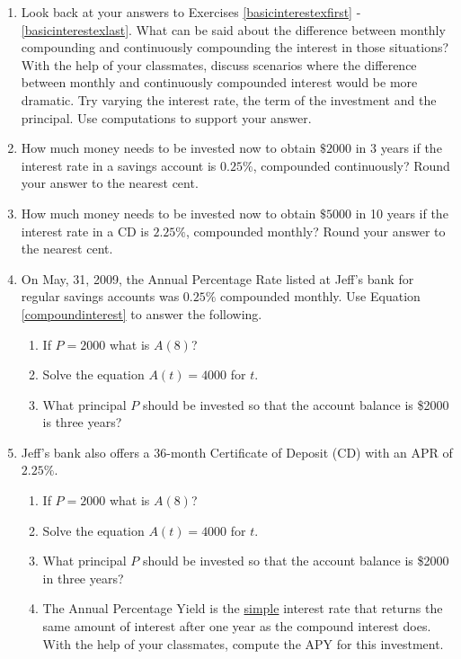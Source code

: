 \begin{enumerate}
\setcounter{enumi}{\value{HW}}

\item  Look back at your answers to Exercises \ref{basicinterestexfirst} - \ref{basicinterestexlast}. What can be said about the difference between monthly compounding and continuously compounding the interest in those situations?  With the help of your classmates, discuss scenarios where the difference between monthly  and continuously compounded interest would be more dramatic.  Try varying the interest rate, the term of the investment and the principal.  Use computations to support your answer.

\item  How much money needs to be invested now to obtain $\$2000$ in 3 years if the interest rate in a savings account is $0.25 \%$, compounded continuously?  Round your answer to the nearest cent.

\item  How much money needs to be invested now to obtain $\$5000$ in  10 years if the interest rate in a CD is $2.25 \%$, compounded monthly?  Round your answer to the nearest cent.


\item On May, 31, 2009, the Annual Percentage Rate listed at Jeff's bank for regular savings accounts was $0.25\%$ compounded monthly.  Use Equation \ref{compoundinterest} to answer the following.

\begin{enumerate}

\item If $P = 2000$ what is $A(8)$?
\item Solve the equation $A(t) = 4000$ for $t$.
\item What principal $P$ should be invested so that the account balance is \$2000 is three years?

\end{enumerate}

\pagebreak

\item Jeff's bank also offers a 36-month Certificate of Deposit (CD) with an APR of $2.25\%$.

\begin{enumerate}

\item If $P = 2000$ what is $A(8)$?
\item Solve the equation $A(t) = 4000$ for $t$.
\item What principal $P$ should be invested so that the account balance is \$2000 in three years?
\item The Annual Percentage Yield is the \underline{simple} interest rate that returns the same amount of interest after one year as the compound interest does.  With the help of your classmates, compute the APY for this investment.


\end{enumerate}
\end{enumerate}
